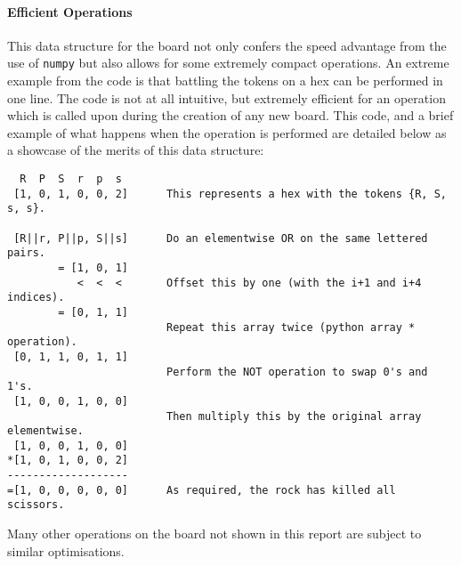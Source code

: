 \documentclass{article}
\begin{document}
\paragraph{Efficient Operations}
This data structure for the board not only confers the speed advantage from the use of \verb|numpy| but also allows for some extremely compact operations. An extreme example from the code is that battling the tokens on a hex can be performed in one line. The code is not at all intuitive, but extremely efficient for an operation which is called upon during the creation of any new board. This code, and a brief example of what happens when the operation is performed are detailed below as a showcase of the merits of this data structure:



\begin{center}
\begin{BVerbatim}
  R  P  S  r  p  s
 [1, 0, 1, 0, 0, 2]      This represents a hex with the tokens {R, S, s, s}.
 
 [R||r, P||p, S||s]      Do an elementwise OR on the same lettered pairs.
        = [1, 0, 1]
           <  <  <       Offset this by one (with the i+1 and i+4 indices).
        = [0, 1, 1]      
                         Repeat this array twice (python array * operation).
 [0, 1, 1, 0, 1, 1]
                         Perform the NOT operation to swap 0's and 1's.
 [1, 0, 0, 1, 0, 0]      
                         Then multiply this by the original array elementwise.
 [1, 0, 0, 1, 0, 0]
*[1, 0, 1, 0, 0, 2]
-------------------
=[1, 0, 0, 0, 0, 0]      As required, the rock has killed all scissors.
\end{BVerbatim}
\end{center}
Many other operations on the board not shown in this report are subject to similar optimisations.
\end{document}
